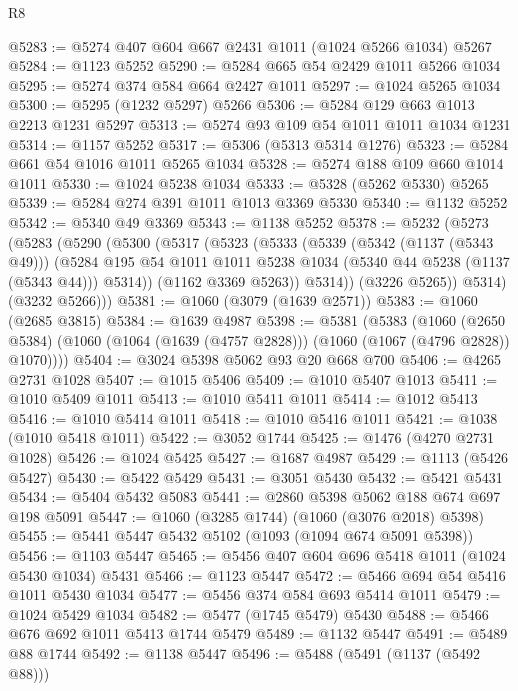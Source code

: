 \begin{lexlean}{R8}
\begin{coremodule}
@5283 := @5274 @407 @604 @667 @2431 @1011 (@1024 @5266 @1034) @5267
@5284 := @1123 @5252
@5290 := @5284 @665 @54 @2429 @1011 @5266 @1034
@5295 := @5274 @374 @584 @664 @2427 @1011
@5297 := @1024 @5265 @1034
@5300 := @5295 (@1232 @5297) @5266
@5306 := @5284 @129 @663 @1013 @2213 @1231 @5297
@5313 := @5274 @93 @109 @54 @1011 @1011 @1034 @1231
@5314 := @1157 @5252
@5317 := @5306 (@5313 @5314 @1276)
@5323 := @5284 @661 @54 @1016 @1011 @5265 @1034
@5328 := @5274 @188 @109 @660 @1014 @1011
@5330 := @1024 @5238 @1034
@5333 := @5328 (@5262 @5330) @5265
@5339 := @5284 @274 @391 @1011 @1013 @3369 @5330
@5340 := @1132 @5252
@5342 := @5340 @49 @3369
@5343 := @1138 @5252
@5378 := @5232
    (@5273
      (@5283
        (@5290
          (@5300
            (@5317
              (@5323
                (@5333
                  (@5339
                    (@5342 (@1137 (@5343 @49)))
                    (@5284
                      @195
                      @54
                      @1011
                      @1011
                      @5238
                      @1034
                      (@5340 @44 @5238 (@1137 (@5343 @44)))
                      @5314))
                  (@1162 @3369 @5263))
                @5314))
            (@3226 @5265))
          @5314)
        (@3232 @5266)))
@5381 := @1060 (@3079 (@1639 @2571))
@5383 := @1060 (@2685 @3815)
@5384 := @1639 @4987
@5398 := @5381
    (@5383
      (@1060
        (@2650 @5384)
        (@1060 (@1064 (@1639 (@4757 @2828))) (@1060 (@1067 (@4796 @2828)) @1070))))
@5404 := @3024 @5398 @5062 @93 @20 @668 @700
@5406 := @4265 @2731 @1028
@5407 := @1015 @5406
@5409 := @1010 @5407 @1013
@5411 := @1010 @5409 @1011
@5413 := @1010 @5411 @1011
@5414 := @1012 @5413
@5416 := @1010 @5414 @1011
@5418 := @1010 @5416 @1011
@5421 := @1038 (@1010 @5418 @1011)
@5422 := @3052 @1744
@5425 := @1476 (@4270 @2731 @1028)
@5426 := @1024 @5425
@5427 := @1687 @4987
@5429 := @1113 (@5426 @5427)
@5430 := @5422 @5429
@5431 := @3051 @5430
@5432 := @5421 @5431
@5434 := @5404 @5432 @5083
@5441 := @2860 @5398 @5062 @188 @674 @697 @198 @5091
@5447 := @1060 (@3285 @1744) (@1060 (@3076 @2018) @5398)
@5455 := @5441 @5447 @5432 @5102 (@1093 (@1094 @674 @5091 @5398))
@5456 := @1103 @5447
@5465 := @5456 @407 @604 @696 @5418 @1011 (@1024 @5430 @1034) @5431
@5466 := @1123 @5447
@5472 := @5466 @694 @54 @5416 @1011 @5430 @1034
@5477 := @5456 @374 @584 @693 @5414 @1011
@5479 := @1024 @5429 @1034
@5482 := @5477 (@1745 @5479) @5430
@5488 := @5466 @676 @692 @1011 @5413 @1744 @5479
@5489 := @1132 @5447
@5491 := @5489 @88 @1744
@5492 := @1138 @5447
@5496 := @5488 (@5491 (@1137 (@5492 @88)))

\end{coremodule}
\end{lexlean}
